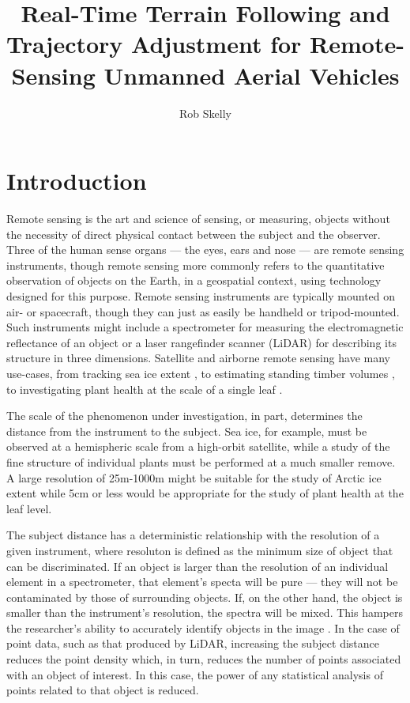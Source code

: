 \documentclass[10pt,a4paper]{report}
\author{Rob Skelly}
\title{Real-Time Terrain Following and Trajectory Adjustment for Remote-Sensing Unmanned Aerial Vehicles}
\begin{document}
\maketitle

\doublespace

\section{Introduction}

Remote sensing is the art and science of sensing, or measuring, objects without the necessity of direct physical contact between the subject and the observer. Three of the human sense organs --- the eyes, ears and nose --- are remote sensing instruments, though remote sensing more commonly refers to the quantitative observation of objects on the Earth, in a geospatial context, using technology designed for this purpose. Remote sensing instruments are typically mounted on air- or spacecraft, though they can just as easily be handheld or tripod-mounted. Such instruments might include a spectrometer for measuring the electromagnetic reflectance of an object or a laser rangefinder scanner (LiDAR) for describing its structure in three dimensions. Satellite and airborne remote sensing have many use-cases, from tracking sea ice extent \cite{Dierking2006,Shuchman2004}, to estimating standing timber volumes \cite{Allouis2011,Tonolli2011}, to investigating plant health at the scale of a single leaf \cite{Palou2013}.

The scale of the phenomenon under investigation, in part, determines the distance from the instrument to the subject. Sea ice, for example, must be observed at a hemispheric scale from a high-orbit satellite, while a study of the fine structure of individual plants must be performed at a much smaller remove. A large resolution of 25m-1000m \cite{Shuchman2004} might be suitable for the study of Arctic ice extent while 5cm or less \cite{Palou2013} would be appropriate for the study of plant health at the leaf level. 

The subject distance has a deterministic relationship with the resolution of a given instrument, where resoluton is defined as the minimum size of object that can be discriminated. If an object is larger than the resolution of an individual element in a spectrometer, that element's specta will be pure --- they will not be contaminated by those of surrounding objects. If, on the other hand, the object is smaller than the instrument's resolution, the spectra will be mixed. This hampers the researcher's ability to accurately identify objects in the image \cite{Lillesand1999}. In the case of point data, such as that produced by LiDAR, increasing the subject distance reduces the point density which, in turn, reduces the number of points associated with an object of interest. In this case, the power of any statistical analysis of points related to that object is reduced. 
\end{document}
